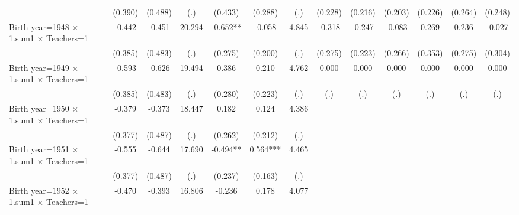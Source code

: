 {\begin{tabular}{l*{12}{c}}
                    &     (0.390)   &     (0.488)   &         (.)   &     (0.433)   &     (0.288)   &         (.)   &     (0.228)   &     (0.216)   &     (0.203)   &     (0.226)   &     (0.264)   &     (0.248)   \\
Birth year=1948 $\times$ 1.sum1 $\times$ Teachers=1&      -0.442   &      -0.451   &      20.294   &      -0.652** &      -0.058   &       4.845   &      -0.318   &      -0.247   &      -0.083   &       0.269   &       0.236   &      -0.027   \\
                    &     (0.385)   &     (0.483)   &         (.)   &     (0.275)   &     (0.200)   &         (.)   &     (0.275)   &     (0.223)   &     (0.266)   &     (0.353)   &     (0.275)   &     (0.304)   \\
Birth year=1949 $\times$ 1.sum1 $\times$ Teachers=1&      -0.593   &      -0.626   &      19.494   &       0.386   &       0.210   &       4.762   &       0.000   &       0.000   &       0.000   &       0.000   &       0.000   &       0.000   \\
                    &     (0.385)   &     (0.483)   &         (.)   &     (0.280)   &     (0.223)   &         (.)   &         (.)   &         (.)   &         (.)   &         (.)   &         (.)   &         (.)   \\
Birth year=1950 $\times$ 1.sum1 $\times$ Teachers=1&      -0.379   &      -0.373   &      18.447   &       0.182   &       0.124   &       4.386   &               &               &               &               &               &               \\
                    &     (0.377)   &     (0.487)   &         (.)   &     (0.262)   &     (0.212)   &         (.)   &               &               &               &               &               &               \\
Birth year=1951 $\times$ 1.sum1 $\times$ Teachers=1&      -0.555   &      -0.644   &      17.690   &      -0.494** &       0.564***&       4.465   &               &               &               &               &               &               \\
                    &     (0.377)   &     (0.487)   &         (.)   &     (0.237)   &     (0.163)   &         (.)   &               &               &               &               &               &               \\
Birth year=1952 $\times$ 1.sum1 $\times$ Teachers=1&      -0.470   &      -0.393   &      16.806   &      -0.236   &       0.178   &       4.077   &               &               &               &               &               &               \\

\end{tabular}}

